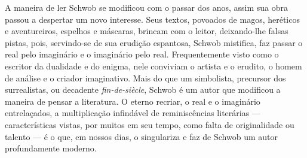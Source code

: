 A maneira de ler Schwob se modificou com o passar dos anos, assim sua obra
passou a despertar um novo interesse. Seus textos, povoados de magos, heréticos
e aventureiros, espelhos e máscaras, brincam com o leitor, deixando-lhe falsas
pistas, pois, servindo-se de sua erudição espantosa, Schwob mistifica, faz
passar o real pelo imaginário e o imaginário pelo real. Frequentemente visto
como o escritor da dualidade e do enigma, nele conviviam o artista e o erudito,
o homem de análise e o criador imaginativo. Mais do que um simbolista,
precursor dos surrealistas, ou decadente \textit{fin-de-siècle}, Schwob é
um autor que modificou a maneira de pensar a literatura. O eterno
recriar, o real e o imaginário entrelaçados, a multiplicação infindável de
reminiscências literárias --- características vistas, por muitos em seu tempo,
como falta de originalidade ou talento --- é o que, em nossos dias, o singulariza
e faz de Schwob um autor profundamente moderno.